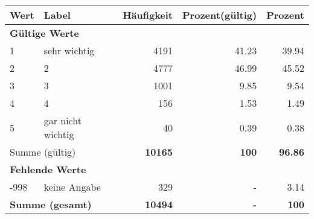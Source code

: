      \begin{longtable}{lXrrr}
     \toprule
     \textbf{Wert} & \textbf{Label} & \textbf{Häufigkeit} & \textbf{Prozent(gültig)} & \textbf{Prozent} \\
     \endhead
     \midrule
     \multicolumn{5}{l}{\textbf{Gültige Werte}}\\

     1 &
     \multicolumn{1}{X}{ sehr wichtig   } &


       \num{4191} &
       \num[round-mode=places,round-precision=2]{41,23} &
         \num[round-mode=places,round-precision=2]{39,94} \\

     2 &
     \multicolumn{1}{X}{ 2   } &


       \num{4777} &
       \num[round-mode=places,round-precision=2]{46,99} &
         \num[round-mode=places,round-precision=2]{45,52} \\

     3 &
     \multicolumn{1}{X}{ 3   } &


       \num{1001} &
       \num[round-mode=places,round-precision=2]{9,85} &
         \num[round-mode=places,round-precision=2]{9,54} \\

     4 &
     \multicolumn{1}{X}{ 4   } &


       \num{156} &
       \num[round-mode=places,round-precision=2]{1,53} &
         \num[round-mode=places,round-precision=2]{1,49} \\

     5 &
     \multicolumn{1}{X}{ gar nicht wichtig   } &


       \num{40} &
       \num[round-mode=places,round-precision=2]{0,39} &
         \num[round-mode=places,round-precision=2]{0,38} \\
     \midrule
     \multicolumn{2}{l}{Summe (gültig)} &
       \textbf{\num{10165}} &
     \textbf{100} &
       \textbf{\num[round-mode=places,round-precision=2]{96,86}} \\
     \multicolumn{5}{l}{\textbf{Fehlende Werte}}\\
       -998 &
       keine Angabe &
         \num{329} &
        - &
         \num[round-mode=places,round-precision=2]{3,14} \\
     \midrule
     \multicolumn{2}{l}{\textbf{Summe (gesamt)}} &
          \textbf{\num{10494}} &
        \textbf{-} &
        \textbf{100} \\
     \bottomrule
     \end{longtable}
     

